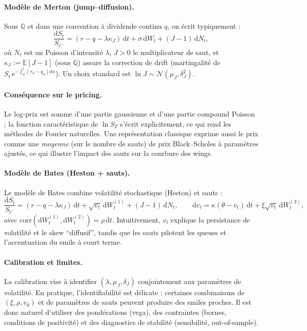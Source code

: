 \documentclass[11pt,a4paper]{article}
\newcommand{\dd}{\mathrm{d}}
\newcommand{\ee}{\mathrm{e}}
\newcommand{\E}{\mathbb{E}}
\newcommand{\QQ}{\mathbb{Q}}
\newcommand{\1}{\mathbf{1}}
\begin{document}
\paragraph{Mod\`ele de Merton (jump--diffusion).}
Sous $\QQ$ et dans une convention \`a dividende continu $q$, on \'ecrit typiquement :
\[
\frac{\dd S_t}{S_{t^-}}
=
(r-q-\lambda\kappa_J)\,\dd t
+
\sigma\,\dd W_t
+
(J-1)\,\dd N_t,
\]
o\`u $N_t$ est un Poisson d'intensit\'e $\lambda$, $J>0$ le multiplicateur de saut, et
$\kappa_J := \E[J-1]$ (sous $\QQ$) assure la correction de drift (martingalit\'e de $S_t\,\ee^{-\int_0^t (r_u-q_u)\dd u}$).
Un choix standard est $\ln J \sim \mathcal{N}(\mu_J,\delta_J^2)$.

\paragraph{Cons\'equence sur le pricing.}
Le log-prix est somme d'une partie gaussienne et d'une partie compound Poisson ; la fonction caract\'eristique
de $\ln S_T$ s'\'ecrit explicitement, ce qui rend les m\'ethodes de Fourier naturelles. Une repr\'esentation classique
exprime aussi le prix comme une \emph{moyenne} (sur le nombre de sauts) de prix Black--Scholes \`a param\`etres ajust\'es,
ce qui illustre l'impact des sauts sur la courbure des wings.

\paragraph{Mod\`ele de Bates (Heston + sauts).}
Le mod\`ele de Bates combine volatilité stochastique (Heston) et sauts :
\[
\frac{\dd S_t}{S_{t^-}}
= (r-q-\lambda\kappa_J)\,\dd t + \sqrt{v_t}\,\dd W_t^{(1)} + (J-1)\,\dd N_t,
\qquad
\dd v_t = \kappa(\theta-v_t)\,\dd t + \xi\sqrt{v_t}\,\dd W_t^{(2)},
\]
avec $\mathrm{corr}(\dd W_t^{(1)},\dd W_t^{(2)})=\rho\,\dd t$.
Intuitivement, $v_t$ explique la persistance de volatilité et le skew ``diffusif'', tandis que les sauts pilotent
les queues et l'accentuation du smile \`a court terme.

\paragraph{Calibration et limites.}
La calibration vise \`a identifier $(\lambda,\mu_J,\delta_J)$ conjointement aux param\`etres de volatilité.
En pratique, l'identifiabilit\'e est d\'elicate : certaines combinaisons de $(\xi,\rho,v_0)$ et de param\`etres de sauts
peuvent produire des smiles proches. Il est donc naturel d'utiliser des pond\'erations (vega), des contraintes
(bornes, conditions de positivité) et des diagnostics de stabilit\'e (sensibilit\'e, out-of-sample).
\end{document}
